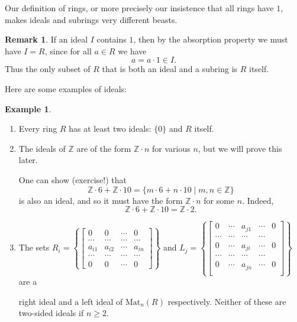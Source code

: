 \documentclass[12pt]{report}
\numberwithin{equation}{section}
\numberwithin{theorem}{chapter}
\theoremstyle{definition}
\newtheorem{example}[theorem]{Example}
\newtheorem*{basic properties}{Basic Properties}
\newtheorem*{Important Remark}{Important Remark}
\newtheorem{remark}[theorem]{Remark}
\begin{document}
Our definition of rings, or more precisely our insistence that all rings have $1$, makes ideals and subrings very different beasts.

\begin{remark} 
If an ideal $I$ contains $1$, then by the absorption property we must have $I = R$, since for all $a \in R$ we have
$$a = a \cdot 1 \in I.$$
Thus the only subset of $R$ that is both an ideal and a subring is $R$ itself.
\end{remark}


Here are some examples of ideals:

\begin{example}
\begin{enumerate}
\item Every ring $R$ has at least two ideals: $\{0\}$ and $R$ itself. 

\item The ideals of $\mathbb{Z}$ are of the form $\mathbb{Z} \cdot n$ for various $n$, but we will prove this later. %

One can show (exercise!) that 
$$\mathbb{Z} \cdot 6 + \mathbb{Z} \cdot 10 = \{m \cdot 6 + n \cdot 10 \mid m,n \in \mathbb{Z}\}$$ 
is also an ideal, and so it must have the form $\mathbb{Z} \cdot n$ for some $n$. Indeed, 
$$\mathbb{Z} \cdot 6 + \mathbb{Z} \cdot 10 = \mathbb{Z} \cdot 2.$$

\item The sets $R_i=\left\{\begin{bmatrix} 0 & 0 & \cdots & 0\\ \cdots & \cdots & \cdots & \cdots \\ a_{i1} & a_{i2} & \cdots &a_{in} \\  \cdots & \cdots & \cdots & \cdots \\  0 &
      0 & \cdots &0\end{bmatrix}\right\}$ and $L_j=\left\{\begin{bmatrix} 0 & \cdots & a_{j1} &\cdots & 0\\ \cdots & \cdots & \cdots & \cdots \\0 & \cdots & a_{ji} &\cdots & 0\\
      \cdots & \cdots & \cdots & \cdots \\ 0 & \cdots & a_{jn} &\cdots & 0\\\end{bmatrix}\right\}$ are a 

\noindent      
right ideal and a left ideal of $\mathrm{Mat}_n(R)$ respectively. Neither of these are two-sided ideals if $n \geqslant 2$.	
\end{enumerate}
\end{example}
\end{document}

